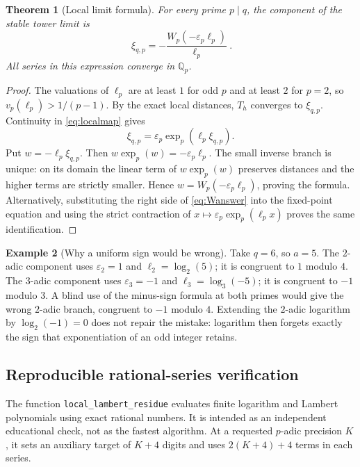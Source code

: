 \documentclass[11pt,a4paper]{article}
\numberwithin{equation}{section}
\theoremstyle{plain}
\newtheorem{theorem}{Theorem}[section]
\theoremstyle{definition}
\newtheorem{example}[theorem]{Example}
\newcommand{\Q}{\mathbb Q}
\newcommand{\eps}{\varepsilon}
\begin{document}
\begin{theorem}[Local limit formula]\label{thm:W}
For every prime $p\mid q$, the component of the stable tower limit is
\begin{equation}\label{eq:Wanswer}
 \boxed{\ \xi_{q,p}=-\frac{W_p(-\eps_p\ell_p)}{\ell_p}\ }.
\end{equation}
All series in this expression converge in $\Q_p$.
\end{theorem}
\begin{proof}
The valuations of $\ell_p$ are at least $1$ for odd $p$ and at least
$2$ for $p=2$, so $v_p(\ell_p)>1/(p-1)$.
By the exact local distances, $T_h$ converges to $\xi_{q,p}$.
Continuity in \eqref{eq:localmap} gives
\[
 \xi_{q,p}=\eps_p\exp_p(\ell_p\xi_{q,p}).
\]
Put $w=-\ell_p\xi_{q,p}$.  Then
$w\exp_p(w)=-\eps_p\ell_p$.
The small inverse branch is unique: on its domain the linear term of
$w\exp_p(w)$ preserves distances and the higher terms are strictly
smaller.  Hence $w=W_p(-\eps_p\ell_p)$, proving the formula.
Alternatively, substituting the right side of \eqref{eq:Wanswer} into
the fixed-point equation and using the strict contraction of
$x\mapsto\eps_p\exp_p(\ell_p x)$ proves the same identification.
\end{proof}

\begin{example}[Why a uniform sign would be wrong]
Take $q=6$, so $a=5$.  The $2$-adic component uses
$\eps_2=1$ and $\ell_2=\log_2(5)$; it is congruent to $1$ modulo $4$.
The $3$-adic component uses $\eps_3=-1$ and
$\ell_3=\log_3(-5)$; it is congruent to $-1$ modulo $3$.
A blind use of the minus-sign formula at both primes would give the
wrong $2$-adic branch, congruent to $-1$ modulo $4$.
Extending the $2$-adic logarithm by $\log_2(-1)=0$ does not repair the
mistake: logarithm then forgets exactly the sign that exponentiation
of an odd integer retains.
\end{example}

\subsection{Reproducible rational-series verification}
The function \texttt{local\_lambert\_residue} evaluates finite logarithm
and Lambert polynomials using exact rational numbers.  It is intended
as an independent educational check, not as the fastest algorithm.
At a requested $p$-adic precision $K$, it sets an auxiliary target of
$K+4$ digits and uses $2(K+4)+4$ terms in each series.
\end{document}
